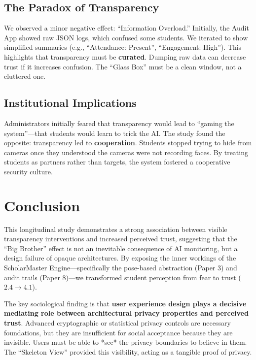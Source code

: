 \documentclass[conference]{IEEEtran}
\begin{document}
\subsection{The Paradox of Transparency}
We observed a minor negative effect: ``Information Overload.'' Initially, the Audit App showed raw JSON logs, which confused some students. We iterated to show simplified summaries (e.g., ``Attendance: Present'', ``Engagement: High''). This highlights that transparency must be \textbf{curated}. Dumping raw data can decrease trust if it increases confusion. The ``Glass Box'' must be a clean window, not a cluttered one.

\subsection{Institutional Implications}
Administrators initially feared that transparency would lead to ``gaming the system''---that students would learn to trick the AI. The study found the opposite: transparency led to \textbf{cooperation}. Students stopped trying to hide from cameras once they understood the cameras were not recording faces. By treating students as partners rather than targets, the system fostered a cooperative security culture.

\section{Conclusion}
This longitudinal study demonstrates a strong association between visible transparency interventions and increased perceived trust, suggesting that the ``Big Brother'' effect is not an inevitable consequence of AI monitoring, but a design failure of opaque architectures. By exposing the inner workings of the ScholarMaster Engine---specifically the pose-based abstraction (Paper 3) and audit trails (Paper 8)---we transformed student perception from fear to trust ($2.4 \to 4.1$).

The key sociological finding is that \textbf{user experience design plays a decisive mediating role between architectural privacy properties and perceived trust}. Advanced cryptographic or statistical privacy controls are necessary foundations, but they are insufficient for social acceptance because they are invisible. Users must be able to *see* the privacy boundaries to believe in them. The ``Skeleton View'' provided this visibility, acting as a tangible proof of privacy. 
\end{document}
